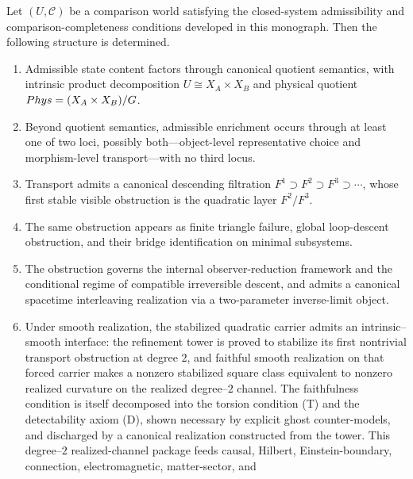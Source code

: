 \begin{theorem}
	\label{thm:intro-structural-rigidity}
	Let \((U,\mathcal C)\) be a comparison world satisfying the closed-system
	admissibility and comparison-completeness conditions developed in this
	monograph.
	Then the following structure is determined.
	\begin{enumerate}[label=\textup{(\arabic*)}]
		\item
		      Admissible state content factors through canonical quotient
		      semantics, with intrinsic product decomposition
		      \(U\cong X_A\times X_B\) and physical quotient
		      \(Phys=(X_A\times X_B)/G\).
		\item
		      Beyond quotient semantics, admissible enrichment occurs through at
		      least one of two loci, possibly both---object-level representative
		      choice and morphism-level transport---with no third locus.
		\item
		      Transport admits a canonical descending filtration
		      \(F^1\supset F^2\supset F^3\supset\cdots\),
		      whose first stable visible obstruction is the quadratic layer
		      \(F^2/F^3\).
		\item
		      The same obstruction appears as finite triangle failure,
		      global loop-descent obstruction, and their bridge identification on
		      minimal subsystems.
		\item
		      The obstruction governs the internal observer-reduction framework and
		      the conditional regime of compatible irreversible descent, and admits
		      a canonical spacetime interleaving realization via a two-parameter
		      inverse-limit object.
		\item
		      Under smooth realization, the stabilized quadratic carrier admits an
		      intrinsic--smooth interface: the refinement tower is proved to
		      stabilize its first nontrivial transport obstruction at degree
		      \(2\), and faithful smooth realization on that forced carrier makes a
		      nonzero stabilized square class equivalent to nonzero realized
		      curvature on the realized degree--\(2\) channel.  The faithfulness
		      condition is itself decomposed into the torsion condition
		      \textup{(T)} and the detectability axiom \textup{(D)}, shown
		      necessary by explicit ghost counter-models, and discharged by a
		      canonical realization constructed from the tower.  This
		      degree--\(2\) realized-channel package feeds causal, Hilbert,
		      Einstein-boundary, connection, electromagnetic, matter-sector, and

\end{enumerate}
\end{theorem}

